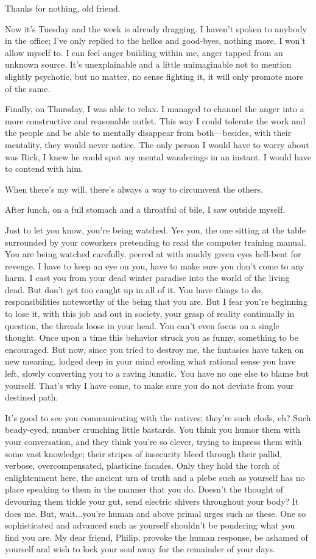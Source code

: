 \documentclass[
]{article}
\begin{document}
Thanks for nothing, old friend.

Now it's Tuesday and the week is already dragging. I haven't spoken to
anybody in the office; I've only replied to the hellos and good-byes,
nothing more, I won't allow myself to. I can feel anger building within
me, anger tapped from an unknown source. It's unexplainable and a little
unimaginable not to mention slightly psychotic, but no matter, no sense
fighting it, it will only promote more of the same.

Finally, on Thursday, I was able to relax. I managed to channel the
anger into a more constructive and reasonable outlet. This way I could
tolerate the work and the people and be able to mentally disappear from
both---besides, with their mentality, they would never notice. The only
person I would have to worry about was Rick, I knew he could spot my
mental wanderings in an instant. I would have to contend with him.

When there's my will, there's always a way to circumvent the others.

After lunch, on a full stomach and a throatful of bile, I saw outside
myself.

Just to let you know, you're being watched. Yes you, the one sitting at
the table surrounded by your coworkers pretending to read the computer
training manual. You are being watched carefully, peered at with muddy
green eyes hell-bent for revenge. I have to keep an eye on you, have to
make sure you don't come to any harm. I cast you from your dead winter
paradise into the world of the living dead. But don't get too caught up
in all of it. You have things to do, responsibilities noteworthy of the
being that you are. But I fear you're beginning to lose it, with this
job and out in society, your grasp of reality continually in question,
the threads loose in your head. You can't even focus on a single
thought. Once upon a time this behavior struck you as funny, something
to be encouraged. But now, since you tried to destroy me, the fantasies
have taken on new meaning, lodged deep in your mind eroding what
rational sense you have left, slowly converting you to a raving lunatic.
You have no one else to blame but yourself. That's why I have come, to
make sure you do not deviate from your destined path.

It's good to see you communicating with the natives; they're such clods,
eh? Such beady-eyed, number crunching little bastards. You think you
humor them with your conversation, and they think you're so clever,
trying to impress them with some vast knowledge; their stripes of
insecurity bleed through their pallid, verbose, overcompensated,
plasticine facades. Only they hold the torch of enlightenment here, the
ancient urn of truth and a plebe such as yourself has no place speaking
to them in the manner that you do. Doesn't the thought of devouring them
tickle your gut, send electric shivers throughout your body? It does me.
But, wait...you're human and above primal urges such as these. One so
sophisticated and advanced such as yourself shouldn't be pondering what
you find you are. My dear friend, Philip, provoke the human response, be
ashamed of yourself and wish to lock your soul away for the remainder of
your days.
\end{document}

